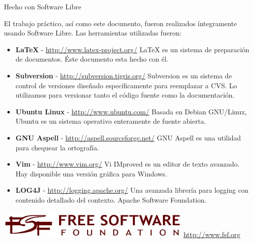 %
% 
%

\thispagestyle{empty}

\begin{center}
\LARGE{Hecho con Software Libre}
\end{center}

\noindent

El trabajo práctico, así como este documento, fueron realizados íntegramente
usando Software Libre. Las herramientas utilizadas fueron:

\begin{flushleft}
\begin{itemize}

\item \textbf{\LaTeX} - \href{http://www.latex-project.org/}
  {http://www.latex-project.org/}
\linebreak\LaTeX{} es un sistema de preparación de documentos. Éste
  documento esta hecho con él.

\item \textbf{Subversion} - \href{http://subversion.tigris.org/}
  {http://subversion.tigris.org/}
\linebreak Subversion es un sistema de control de versiones diseñado
  específicamente para reemplazar a CVS. Lo utilizamos para versionar
  tanto el código fuente como la documentación.

\item \textbf{Ubuntu Linux} - \href{http://www.ubuntu.com/}
  {http://www.ubuntu.com/}
\linebreak Basada en Debian GNU/Linux, Ubuntu es un sistema operativo
enteramente de fuente abierta.

\item \textbf{GNU Aspell} - \href{http://aspell.sourceforge.net//}
  {http://aspell.sourceforge.net/}
\linebreak GNU Aspell es una utilidad para chequear la ortografía.

\item \textbf{Vim} - \href{http://www.vim.org/}
  {http://www.vim.org/}
\linebreak Vi IMproved es un editor de texto avanzado. Hay disponible una
versión gráfica para Windows.

\item \textbf{LOG4J} - \href{http://logging.apache.org/}
  {http://logging.apache.org/}
\linebreak Una avanzada librería para logging con contenido detallado 
del contexto. Apache Software Foundation.


\end{itemize}
\end{flushleft}

\begin{center}
\includegraphics[scale=0.50]{hechoconsl/logofsf.jpg}
\linebreak\href{http://www.fsf.org}{http://www.fsf.org}
\end{center}
